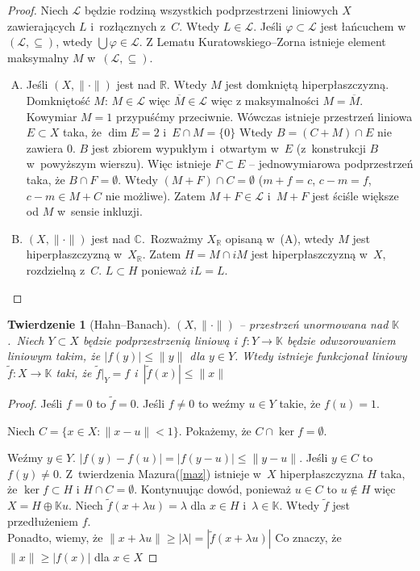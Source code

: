\documentclass[11pt]{mwrep}
\renewcommand{\[}{\begin{equation}}
\renewcommand{\]}{\end{equation}}
\newcommand{\C}{{\ensuremath{\mathbb C}}}
\newcommand{\R}{{\ensuremath{\mathbb R}}}
\newcommand{\K}{\ensuremath{\mathbb{K}}}
\newcommand{\norm}{\|\cdot\|}
\newtheorem{twr}[subsection]{Twierdzenie}%
\newcounter{numer}
\begin{document}
\begin{proof}
	Niech $\mathcal{L}$ będzie rodziną wszystkich podprzestrzeni liniowych $X$ zawierających $L$ i~rozłącznych z~$C$.
	Wtedy $L \in \mathcal{L}$. Jeśli $\varphi \subset \mathcal{L}$ jest łańcuchem w~$(\mathcal{L},\subseteq)$, wtedy $\bigcup \varphi\in \mathcal{L}$.
	Z Lematu Kuratowskiego--Zorna istnieje element maksymalny $M$ w~$(\mathcal{L}, \subseteq)$.
	\begin{enumerate}[(A)]
		\item Jeśli $(X,\|\cdot\|)$ jest nad \R. Wtedy $M$ jest domkniętą hiperpłaszczyzną.
			Domkniętość $M$: $M\in \mathcal{L}$ więc $\overline{M} \in \mathcal{L}$ więc z maksymalności $M=\overline{M}$.
			Kowymiar $M=1$ przypuśćmy przeciwnie. Wówczas istnieje przestrzeń liniowa $E\subset X$ taka, że $\dim E =2$ i~$E\cap M=\{0\}$
			Wtedy $B=(C+M)\cap E$ nie zawiera 0.
			$B$ jest zbiorem wypukłym i~otwartym w~$E$ (z~konstrukcji $B$ w~powyższym wierszu).
			Więc istnieje $F\subset E$ -- jednowymiarowa podprzestrzeń taka, że $B\cap F = \emptyset$.
			Wtedy $(M+F)\cap C= \emptyset $ ($m+f=c$, $c-m=f$, $c-m \in M+C$ nie możliwe).
			Zatem $M+F \in \mathcal{L}$ i~$M+F$ jest ściśle większe od $M$ w~sensie inkluzji.
		\item $(X,\norm)$ jest nad \C.~Rozważmy $X_\R$ opisaną w~(A), wtedy $M$ jest hiperpłaszczyzną w~$X_{\R}$.
			Zatem $H=M\cap iM$ jest hiperpłaszczyzną w~$X$, rozdzielną z~$C$. $L\subset H$ ponieważ $iL=L$.
	\end{enumerate}
\end{proof}
\begin{twr}[Hahn--Banach]
	$(X,\norm)$ -- przestrzeń unormowana nad \K.~Niech $Y\subset X$ będzie podprzestrzenią liniową i 
	$f:Y\to \K$ będzie odwzorowaniem liniowym takim, że $|f(y)| \le \|y\|$ dla $y\in Y$.
	Wtedy istnieje funkcjonał liniowy $\tilde{f} :X \to \K$ taki, że $\tilde{f}|_Y = f$ i~$|\tilde{f}(x)|\le \|x\|$
\end{twr}
\begin{proof}
  Jeśli $f=0$ to $\tilde{f} = 0$. Jeśli $f\not =0$ to weźmy $u \in Y$  takie, że $f(u)=1$.\par
	Niech $C =\{ x \in X: \|x - u\|<1\}$. Pokażemy, że $C\cap \ker f = \emptyset$.\par
	Weźmy $y\in Y$.
	$|f(y)-f(u)|=|f(y-u)|\le \|y - u\|$. Jeśli $y\in C$ to  $f(y) \not =0$.
	Z~{twierdzenia Mazura(\ref{maz})} istnieje w~$X$ hiperpłaszczyzna $H$ taka, że $\ker f\subset H$ i $H\cap C = \emptyset$.
	Kontynuując dowód, ponieważ $u\in C$ to $u \not \in H$ więc $X=H\oplus \K u$.
	Niech $\tilde{f}(x+\lambda u) = \lambda$ dla $x\in H$ i~$\lambda \in \K$. Wtedy $\tilde{f}$ jest  przedłużeniem $f$.\\
	Ponadto, wiemy, że $\|x +\lambda u\|\ge |\lambda| = |\tilde{f} (x+\lambda u)|$ Co znaczy, że $\|x\| \ge |f(x)|$ dla $x\in X$
\end{proof}
\end{document}
